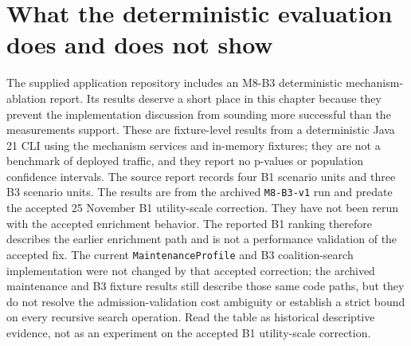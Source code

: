 \section{What the deterministic evaluation does and does not show}
\label{sec:ch21-evaluation-evidence}

The supplied application repository includes an M8-B3 deterministic mechanism-ablation report. Its results deserve a short place in this chapter because they prevent the implementation discussion from sounding more successful than the measurements support. These are fixture-level results from a deterministic Java 21 CLI using the mechanism services and in-memory fixtures; they are not a benchmark of deployed traffic, and they report no p-values or population confidence intervals. The source report records four B1 scenario units and three B3 scenario units. The results are from the archived \texttt{M8-B3-v1} run and predate the accepted 25 November B1 utility-scale correction. They have not been rerun with the accepted enrichment behavior. The reported B1 ranking therefore describes the earlier enrichment path and is not a performance validation of the accepted fix. The current \texttt{MaintenanceProfile} and B3 coalition-search implementation were not changed by that accepted correction; the archived maintenance and B3 fixture results still describe those same code paths, but they do not resolve the admission-validation cost ambiguity or establish a strict bound on every recursive search operation. Read the table as historical descriptive evidence, not as an experiment on the accepted B1 utility-scale correction.

